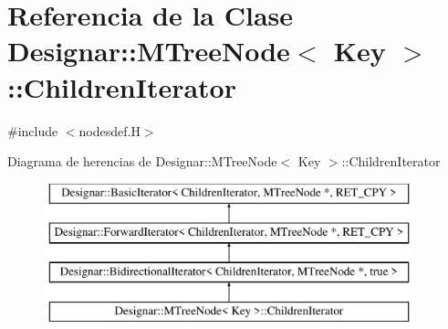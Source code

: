 \hypertarget{class_designar_1_1_m_tree_node_1_1_children_iterator}{}\section{Referencia de la Clase Designar\+:\+:M\+Tree\+Node$<$ Key $>$\+:\+:Children\+Iterator}
\label{class_designar_1_1_m_tree_node_1_1_children_iterator}


{\ttfamily \#include $<$nodesdef.\+H$>$}

Diagrama de herencias de Designar\+:\+:M\+Tree\+Node$<$ Key $>$\+:\+:Children\+Iterator\begin{figure}[H]
\begin{center}
\leavevmode
\includegraphics[height=4.000000cm]{class_designar_1_1_m_tree_node_1_1_children_iterator}
\end{center}
\end{figure}
